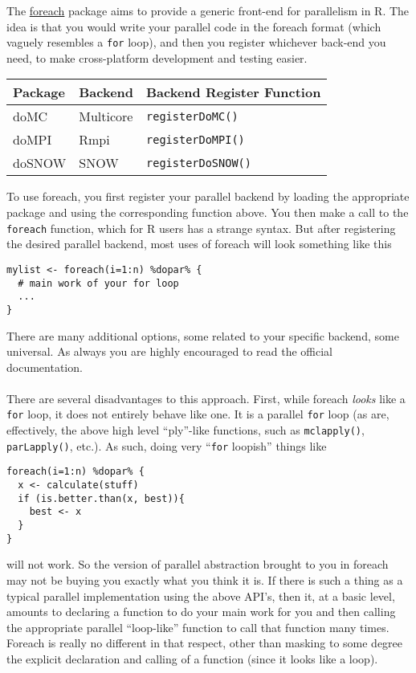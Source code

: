 The \href{http://cran.r-project.org/web/packages/foreach/index.html}{foreach} package aims to provide a generic front-end for parallelism in R.  The idea is that you would write your parallel code in the foreach format (which vaguely resembles a \texttt{for} loop), and then you register whichever back-end you need, to make cross-platform development and testing easier.  

\begin{table}[h]
 \centering
 \begin{tabular}{lll}\hline
  Package & Backend & Backend Register Function\\\hline
  doMC & Multicore & \texttt{registerDoMC()}\\
  doMPI & Rmpi & \texttt{registerDoMPI()}\\
  doSNOW & SNOW & \texttt{registerDoSNOW()}\\\hline
 \end{tabular}
\end{table}
To use foreach, you first register your parallel backend by loading the appropriate package and using the corresponding function above.  You then make a call to the \texttt{foreach} function, which for R users has a strange syntax.  But after registering the desired parallel backend, most uses of foreach will look something like this
\begin{lstlisting}[language=rr]
mylist <- foreach(i=1:n) %dopar% {
  # main work of your for loop
  ...
}
\end{lstlisting}
There are many additional options, some related to your specific backend, some universal.  As always you are highly encouraged to read the official documentation.\\\\
%
There are several disadvantages to this approach.  First, while foreach \emph{looks} like a \texttt{for} loop, it does not entirely behave like one.  It is a parallel \texttt{for} loop (as are, effectively, the above high level ``ply''-like functions, such as \texttt{mclapply()}, \texttt{parLapply()}, etc.).  As such, doing very ``\texttt{for} loopish'' things like
\begin{lstlisting}[language=rr]
foreach(i=1:n) %dopar% {
  x <- calculate(stuff)
  if (is.better.than(x, best)){
    best <- x
  }
}
\end{lstlisting}
will not work.  So the version of parallel abstraction brought to you in foreach may not be buying you exactly what you think it is.  If there is such a thing as a typical parallel implementation using the above API's, then it, at a basic level, amounts to declaring a function to do your main work for you and then calling the appropriate parallel ``loop-like'' function to call that function many times.  Foreach is really no different in that respect, other than masking to some degree the explicit declaration and calling of a function (since it looks like a loop).\\\\
